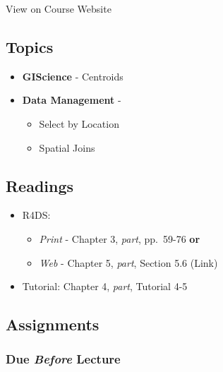 \documentclass[]{book}
\providecommand{\tightlist}{%
  \setlength{\itemsep}{0pt}\setlength{\parskip}{0pt}}
\begin{document}
View on Course Website

\hypertarget{topics-11}{%
\subsection*{Topics}\label{topics-11}}

\begin{itemize}
\tightlist
\item
  \textbf{GIScience} - Centroids
\item
  \textbf{Data Management} -

  \begin{itemize}
  \tightlist
  \item
    Select by Location
  \item
    Spatial Joins
  \end{itemize}
\end{itemize}

\hypertarget{readings-11}{%
\subsection*{Readings}\label{readings-11}}

\begin{itemize}
\tightlist
\item
  R4DS:

  \begin{itemize}
  \tightlist
  \item
    \emph{Print} - Chapter 3, \emph{part}, pp.~59-76 \textbf{or}
  \item
    \emph{Web} - Chapter 5, \emph{part}, Section 5.6 (Link)
  \end{itemize}
\item
  Tutorial: Chapter 4, \emph{part}, Tutorial 4-5
\end{itemize}

\hypertarget{assignments-12}{%
\subsection*{Assignments}\label{assignments-12}}

\hypertarget{due-before-lecture-10}{%
\subsubsection*{\texorpdfstring{Due \emph{Before} Lecture}{Due Before Lecture}}\label{due-before-lecture-10}}
\end{document}
